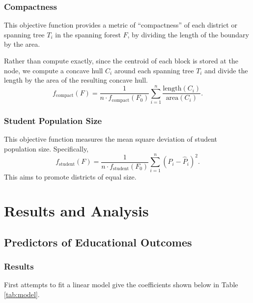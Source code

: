 \documentclass{article}
\begin{document}
\subsubsection*{Compactness}
This objective function provides a metric of ``compactness'' of each district or spanning tree \(T_i\) in the spanning forest \(F\), by dividing the length of the boundary by the area. 

Rather than compute exactly, since the centroid of each block is stored at the node, we compute a concave hull \(C_i\) around each spanning tree \(T_i\) and divide the length by the area of the resulting concave hull.
\begin{equation}\label{eq:obj-compactness}
    f_{\text{compact}}(F) = \frac{1}{n \cdot f_\text{compact}(F_0)} \sum^{n}_{i=1} \frac{\text{length}(C_i)}{\text{area}(C_i)}.
\end{equation}

\subsubsection*{Student Population Size}
This objective function measures the mean square deviation of student population size. Specifically,
\begin{equation}
    f_{\text{student}}(F) = \frac{1}{n \cdot f_\text{student}(F_0)} \sum^{n}_{i=1} \left(P_i - \hat{P}_i\right)^2.
\end{equation}
This aims to promote districts of equal size.

\section{Results and Analysis}
\subsection{Predictors of Educational Outcomes}
\subsubsection{Results}\label{sec:model-results}
First attempts to fit a linear model give the coefficients shown below in Table \ref{tab:model}.
    
\end{document}
